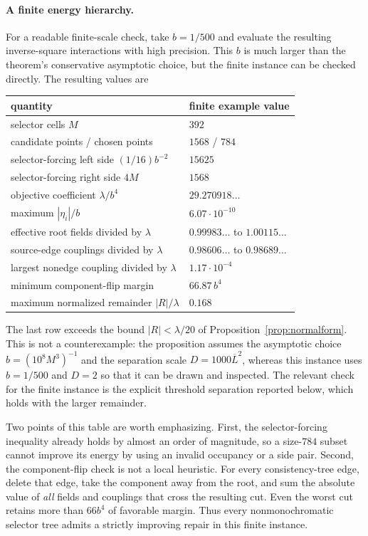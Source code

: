 \documentclass[12pt,a4paper]{article}
\begin{document}
\paragraph{A finite energy hierarchy.}
For a readable finite-scale check, take $b=1/500$ and evaluate the resulting inverse-square interactions with high precision.  This $b$ is much larger than the theorem's conservative asymptotic choice, but the finite instance can be checked directly.  The resulting values are

\begin{center}
\begin{tabular}{@{}ll@{}}
\toprule
quantity & finite example value \\
\midrule
selector cells $M$ & $392$ \\
candidate points / chosen points & $1568$ / $784$ \\
selector-forcing left side $(1/16)b^{-2}$ & $15625$ \\
selector-forcing right side $4M$ & $1568$ \\
objective coefficient $\lambda/b^4$ & $29.270918\ldots$ \\
maximum $|\eta_i|/b$ & $6.07\cdot10^{-10}$ \\
effective root fields divided by $\lambda$ & $0.99983\ldots$ to $1.00115\ldots$ \\
source-edge couplings divided by $\lambda$ & $0.98606\ldots$ to $0.98689\ldots$ \\
largest nonedge coupling divided by $\lambda$ & $1.17\cdot10^{-4}$ \\
minimum component-flip margin & $66.87\,b^4$ \\
maximum normalized remainder $|R|/\lambda$ & $0.168$ \\
\bottomrule
\end{tabular}
\end{center}

The last row exceeds the bound $|R|<\lambda/20$ of Proposition~\ref{prop:normalform}.  This is not a counterexample: the proposition assumes the asymptotic choice $b=(10^8M^3)^{-1}$ and the separation scale $D=1000\overline L^2$, whereas this instance uses $b=1/500$ and $D=2$ so that it can be drawn and inspected.  The relevant check for the finite instance is the explicit threshold separation reported below, which holds with the larger remainder.

Two points of this table are worth emphasizing.  First, the selector-forcing inequality already holds by almost an order of magnitude, so a size-$784$ subset cannot improve its energy by using an invalid occupancy or a side pair.  Second, the component-flip check is not a local heuristic.  For every consistency-tree edge, delete that edge, take the component away from the root, and sum the absolute value of \emph{all} fields and couplings that cross the resulting cut.  Even the worst cut retains more than $66b^4$ of favorable margin.  Thus every nonmonochromatic selector tree admits a strictly improving repair in this finite instance.
\end{document}
